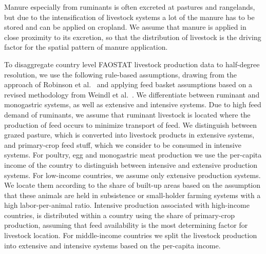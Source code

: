 \documentclass[gc, manuscript]{copernicus}
\begin{document}
Manure especially from ruminants is often excreted at pastures and rangelands, but due to the intensification of livestock systems a lot of the manure has to be stored and can be applied on cropland. We assume that manure is applied in close proximity to its excretion, so that the distribution of livestock is the driving factor for the spatial pattern of manure application.

To disaggregate country level FAOSTAT livestock production data to half-degree resolution, we use the following rule-based assumptions, drawing from the approach of Robinson et al.~\citeyearpar{robinson_mapping_2014} and applying feed basket assumptions based on a revised methodology from Weindl et al.~\citeyearpar{weindl_livestock_2017}. We differentiate between ruminant and monogastric systems, as well as extensive and intensive systems.
Due to high feed demand of ruminants, we assume that ruminant livestock is located where the production of feed occurs to minimize transport of feed. We distinguish between grazed pasture, which is converted into livestock products in extensive systems, and primary-crop feed stuff, which we consider to be consumed in intensive systems.
For poultry, egg and monogastric meat production we use the per-capita income of the country to distinguish between intensive and extensive production systems. For low-income countries, we assume only extensive production systems. We locate them according to the share of built-up areas based on the assumption that these animals are held in subsistence or small-holder farming systems with a high labor-per-animal ratio. Intensive production associated with high-income countries, is distributed within a country using the share of primary-crop production, assuming that feed availability is the most determining factor for livestock location. For middle-income countries we split the livestock production into extensive and intensive systems based on the per-capita income.
\end{document}
